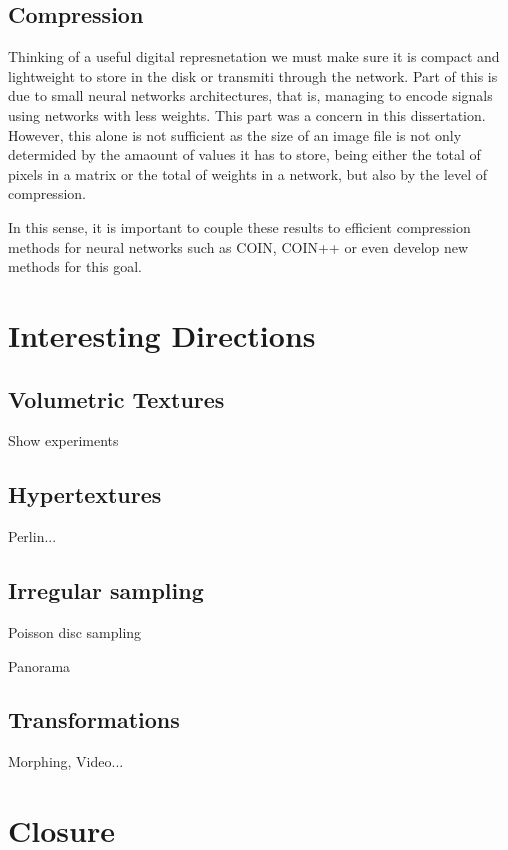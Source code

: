 \subsection{Compression}

Thinking of a useful digital represnetation we must make sure it is compact and lightweight to store in the disk or transmiti through the network. Part of this is due to small neural networks architectures, that is, managing to encode signals using networks with less weights. This part was a concern in this dissertation. However, this alone is not sufficient as the size of an image file is not only determided by the amaount of values it has to store, being either the total of pixels in a matrix or the total of weights in a network, but also by the level of compression.

In this sense, it is important to couple these results to efficient compression methods for neural networks such as COIN, COIN++ or even develop new methods for this goal.


\section{Interesting Directions}


\subsection{Volumetric Textures}


Show experiments

\subsection{Hypertextures}

Perlin...

\subsection{Irregular sampling}

Poisson disc sampling

Panorama

\subsection{Transformations}

Morphing, Video...


\section{Closure}

